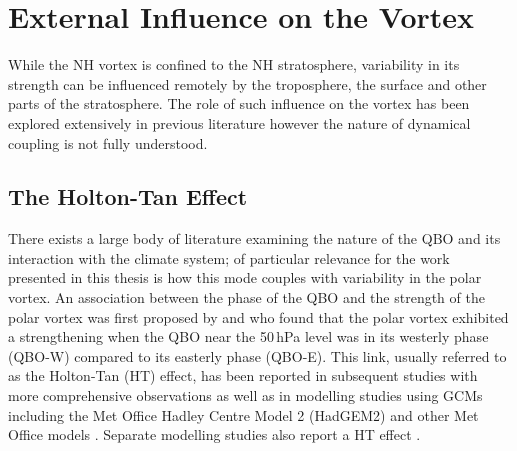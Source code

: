 \section{External Influence on the Vortex}
\label{sec:external_influence}

While the NH vortex is confined to the NH stratosphere, variability in its strength can be influenced remotely by the troposphere, the surface and other parts of the stratosphere. The role of such influence on the vortex has been explored extensively in previous literature however the nature of dynamical coupling is not fully understood. 

\subsection{The Holton-Tan Effect}
\label{sec:external_influence_HT}

There exists a large body of literature examining the nature of the QBO and its interaction with the climate system; of particular relevance for the work presented in this thesis is how this mode couples with variability in the polar vortex. An association between the phase of the QBO and the strength of the polar vortex was first proposed by \cite{HoltonJamesRTan1980} and \cite{Holton1982} who found that the polar vortex exhibited a strengthening when the QBO near the 50\,hPa level was in its westerly phase (QBO-W) compared to its easterly phase (QBO-E). This link, usually referred to as the Holton-Tan (HT) effect, has been reported in subsequent studies with more comprehensive observations as well as in modelling studies using GCMs including the Met Office Hadley Centre Model 2 (HadGEM2) \citep{Watson2014} and other Met Office models \citep{Garfinkel2018}. Separate modelling studies also report a HT effect \citep{Baldwin1991,pascoeQuasibiennial2005b,luDecadalscale2008}.

